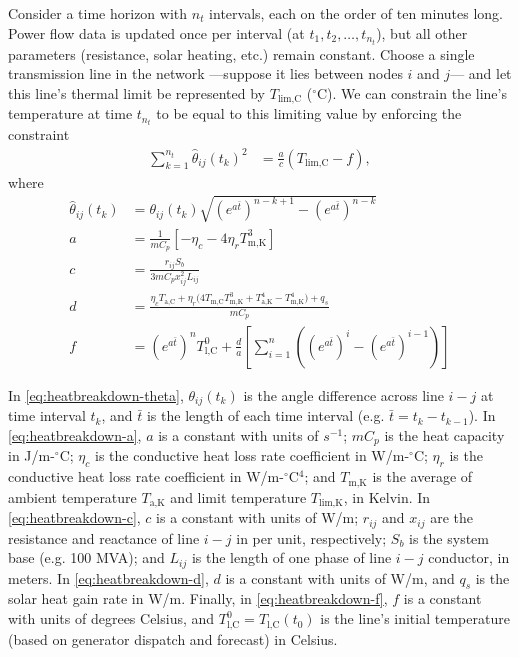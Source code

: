 \documentclass[journal,twoside]{IEEEtran}
\begin{document}
Consider a time horizon with $n_t$ intervals, each on the order of ten minutes long. Power flow data is updated once per interval (at $t_1,t_2,\ldots,t_{n_t}$), but all other parameters (resistance, solar heating, etc.) remain constant. Choose a single transmission line in the network ---suppose it lies between nodes $i$ and $j$--- and let this line's thermal limit be represented by $T_\text{lim,C}$ ($^\circ$C). We can constrain the line's temperature at time $t_{n_t}$ to be equal to this limiting value by enforcing the constraint
\begin{align}\label{eq:tempconstraint}
\sum_{k=1}^{n_t} \hat{\theta}_{ij}(t_k)^2 &= \frac{a}{c}\left(T_\text{lim,C} - f\right),
\end{align}
where
\begin{subequations}\label{eq:heatbreakdown}
\begin{align}
\label{eq:heatbreakdown-theta}\hat{\theta}_{ij}(t_{k}) &= \theta_{ij}(t_k)\sqrt{ (e^{a\bar{t}})^{n-k+1} - (e^{a\bar{t}})^{n-k} } \\
\label{eq:heatbreakdown-a}a &= \frac{1}{mC_p}\left[ -\eta_c - 4\eta_r T_\text{m,K}^3 \right] \\
\label{eq:heatbreakdown-c}c &= \frac{r_{ij}S_b}{3 mC_p x_{ij}^2L_{ij}} \\
\label{eq:heatbreakdown-d}d &= \frac{ \eta_cT_\text{a,C} + \eta_r\big( 4T_\text{m,C}T_\text{m,K}^3 + T_\text{a,K}^4 - T_\text{m,K}^4   \big) + q_s }{mC_p} \\
\label{eq:heatbreakdown-f}f &= (e^{a\bar{t}})^n T_\text{l,C}^0 + \frac{d}{a}\left[ \sum_{i=1}^n \left( (e^{a\bar{t}})^i - (e^{a\bar{t}})^{i-1} \right)\right]
\end{align}
\end{subequations}

In \eqref{eq:heatbreakdown-theta}, $\theta_{ij}(t_k)$ is the angle difference across line $i-j$ at time interval $t_k$, and $\bar{t}$ is the length of each time interval (e.g. $\bar{t}=t_k-t_{k-1}$). In \eqref{eq:heatbreakdown-a}, $a$ is a constant with units of $s^{-1}$; $mC_p$ is the heat capacity in J/m-$^\circ$C; $\eta_c$ is the conductive heat loss rate coefficient in W/m-$^\circ$C; $\eta_r$ is the conductive heat loss rate coefficient in W/m-$^\circ$C$^4$; and $T_\text{m,K}$ is the average of ambient temperature $T_\text{a,K}$ and limit temperature $T_\text{lim,K}$, in Kelvin. In \eqref{eq:heatbreakdown-c}, $c$ is a constant with units of W/m; $r_{ij}$ and $x_{ij}$ are the resistance and reactance of line $i-j$ in per unit, respectively; $S_b$ is the system base (e.g. 100 MVA); and $L_{ij}$ is the length of one phase of line $i-j$ conductor, in meters. In \eqref{eq:heatbreakdown-d}, $d$ is a constant with units of W/m, and $q_s$ is the solar heat gain rate in W/m. Finally, in \eqref{eq:heatbreakdown-f}, $f$ is a constant with units of degrees Celsius, and $T_\text{l,C}^0 = T_\text{l,C}(t_0)$ is the line's initial temperature (based on generator dispatch and forecast) in Celsius.
\end{document}
